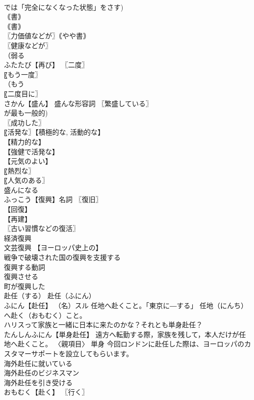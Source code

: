 \documentclass[8pt]{extreport}
\begin{document}
\begin{CJK}{UTF8}{min}
\\	では「完全になくなった状態」をさす) 
\\	｟書｠ 
\\	｟書｠ 
\\	〖力価値などが〗｟やや書｠
\\	〖健康などが〗
\\	（弱る
\\	ふたたび【再び】 〖二度〗
\\	〖もう一度〗
\\	（もう 
\\	〖二度目に〗
\\	さかん【盛ん】 盛んな形容詞 〖繁盛している〗
\\	が最も一般的) 
\\	〖成功した〗
\\	〖活発な〗【積極的な, 活動的な】
\\	【精力的な】
\\	【強健で活発な】
\\	【元気のよい】
\\	〖熱烈な〗
\\	〖人気のある〗
\\	盛んになる 
\\	ふっこう【復興】名詞 〖復旧〗
\\	【回復】
\\	【再建】
\\	〖古い習慣などの復活〗
\\	経済復興 
\\	文芸復興 【ヨーロッパ史上の】
\\	戦争で破壊された国の復興を支援する 
\\	復興する動詞 
\\	復興させる 
\\	町が復興した 
\\	赴任（する）		赴任（ふにん） 
\\	ふにん【赴任】 （名）スル 任地へ赴くこと。「東京に―する」 任地（にんち）へ赴く（おもむく）こと。 
\\	ハリスって家族と一緒に日本に来たのかな？それとも単身赴任？ 
\\	たんしんふにん【単身赴任】 遠方へ転勤する際，家族を残して，本人だけが任地へ赴くこと。 〈親項目〉 単身 今回ロンドンに赴任した際は、ヨーロッパのカスタマーサポートを設立してもらいます。 
\\	海外赴任に就いている 
\\	海外赴任のビジネスマン 
\\	海外赴任を引き受ける 
\\	おもむく【赴く】 〖行く〗

\end{CJK}
\end{document}
